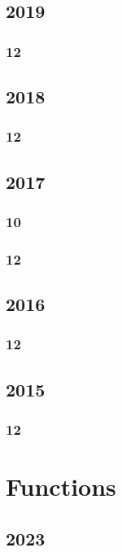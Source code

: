 \documentclass[11pt]{book}
\begin{document}
\section{2019}
\subsection{12}





\section{2018}
\subsection{12}




\section{2017}
\subsection{10}

\subsection{12}


\section{2016}
\subsection{12}


\section{2015}
\subsection{12}



\chapter{Functions}
\section{2023}
\end{document}
